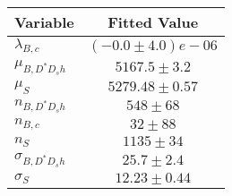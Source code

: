 \begin{tabular}[t]{lc}
\hline
Variable &Fitted Value\\
\hline\hline
$\lambda_{B,c}$&$(-0.0\pm4.0)e-06$\\
\hline
$\mu_{B, D^* D_s h}$&$5167.5\pm3.2$\\
\hline
$\mu_S$&$5279.48\pm0.57$\\
\hline
$n_{B, D^* D_s h}$&$548\pm68$\\
\hline
$n_{B,c}$&$32\pm88$\\
\hline
$n_S$&$1135\pm34$\\
\hline
$\sigma_{B, D^* D_s h}$&$25.7\pm2.4$\\
\hline
$\sigma_S$&$12.23\pm0.44$\\
\hline
\end{tabular}